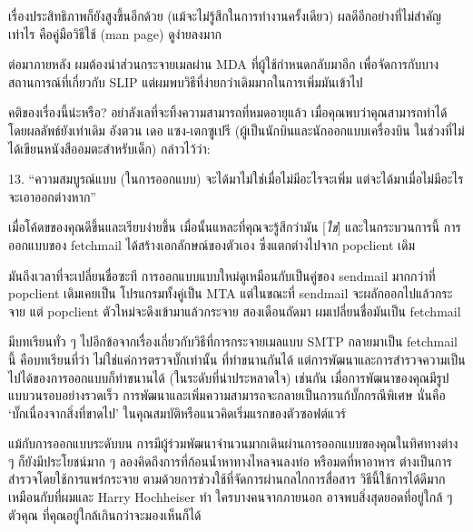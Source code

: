 เรื่องประสิทธิภาพก็ยังสูงขึ้นอีกด้วย
(แม้จะไม่รู้สึกในการทำงานครั้งเดียว) ผลดีอีกอย่างที่ไม่สำคัญเท่าไร
คือคู่มือวิธีใช้ (man page) ดูง่ายลงมาก

ต่อมาภายหลัง ผมต้องนำส่วนกระจายเมลผ่าน MDA ที่ผู้ใช้กำหนดกลับมาอีก
เพื่อจัดการกับบางสถานการณ์ที่เกี่ยวกับ SLIP
แต่ผมพบวิธีที่ง่ายกว่าเดิมมากในการเพิ่มมันเข้าไป

คติของเรื่องนี้น่ะหรือ? อย่าลังเลที่จะทิ้งความสามารถที่หมดอายุแล้ว
เมื่อคุณพบว่าคุณสามารถทำได้โดยผลลัพธ์ยังเท่าเดิม อังตวน เดอ
แซง-เตกซูเปรี (ผู้เป็นนักบินและนักออกแบบเครื่องบิน
ในช่วงที่ไม่ได้เขียนหนังสืออมตะสำหรับเด็ก) กล่าวไว้ว่า:

\begin{fancyquotes}
  13. ``ความสมบูรณ์แบบ (ในการออกแบบ) จะได้มาไม่ใช่เมื่อไม่มีอะไรจะเพิ่ม
  แต่จะได้มาเมื่อไม่มีอะไรจะเอาออกต่างหาก''
\end{fancyquotes}

เมื่อโค้ดขของคุณดีขึ้นและเรียบง่ายขึ้น เมื่อนั้นแหละที่คุณจะรู้สึกว่ามัน
{[}\emph{ใช่}{]} และในกระบวนการนี้ การออกแบบของ fetchmail
ได้สร้างเอกลักษณ์ของตัวเอง ซึ่งแตกต่างไปจาก popclient เดิม

มันถึงเวลาที่จะเปลี่ยนชื่อซะที การออกแบบแบบใหม่ดูเหมือนกับเป็นคู่ของ
send\-mail มากกว่าที่ popclient เดิมเคยเป็น โปรแกรมทั้งคู่เป็น MTA
แต่ในขณะที่ sendmail จะผลักออกไปแล้วกระจาย แต่ popclient
ตัวใหม่จะดึงเข้ามาแล้วกระจาย สองเดือนถัดมา ผมเปลี่ยนชื่อมันเป็น
fetchmail

มีบทเรียนทั่ว ๆ  ไปอีกข้อจากเรื่องเกี่ยวกับวิธีที่การกระจายเมลแบบ SMTP
กลายมาเป็น fetchmail นี้ คือบทเรียนที่ว่า ไม่ใช่แค่การตรวจบั๊กเท่านั้น
ที่ทำขนานกันได้
แต่การพัฒนาและการสำรวจความเป็นไปได้ของการออกแบบก็ทำขนานได้
(ในระดับที่น่าประหลาดใจ) เช่นกัน
เมื่อการพัฒนาของคุณมีรูปแบบวนรอบอย่างรวดเร็ว
การพัฒนาและเพิ่มความสามารถจะกลายเป็นการแก้บั๊กกรณีพิเศษ นั่นคือ
`บั๊กเนื่องจากสิ่งที่ขาดไป' ในคุณสมบัติหรือแนวคิดเริ่มแรกของตัวซอฟต์แวร์

แม้กับการออกแบบระดับบน
การมีผู้ร่วมพัฒนาจำนวนมากเดินผ่านการออกแบบของคุณในทิศทางต่าง ๆ
ก็ยังมีประโยชน์มาก ๆ  ลองคิดถึงการที่ก้อนน้ำหาทางไหลจนลงท่อ
หรือมดที่หาอาหาร ต่างเป็นการสำรวจโดยใช้การแพร่กระจาย
ตามด้วยการช่วงใช้ที่จัดการผ่านกลไกการสื่อสาร วิธีนี้ใช้การได้ดีมาก
เหมือนกับที่ผมและ Harry Hochheiser ทำ ใครบางคนจากภายนอก
อาจพบสิ่งสุดยอดที่อยู่ใกล้ ๆ  ตัวคุณ ที่คุณอยู่ใกล้เกินกว่าจะมองเห็นก็ได้
